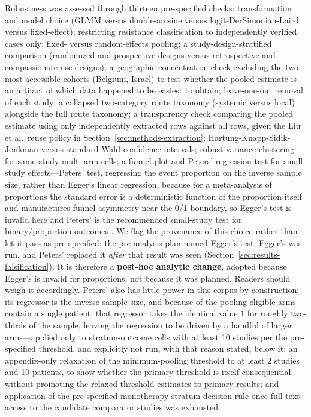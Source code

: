 Robustness was assessed through thirteen pre-specified checks: transformation and model choice (GLMM versus double-arcsine versus logit-DerSimonian-Laird versus fixed-effect); restricting resistance classification to independently verified cases only; fixed- versus random-effects pooling; a study-design-stratified comparison (randomized and prospective designs versus retrospective and compassionate-use designs); a geographic-concentration check excluding the two most accessible cohorts (Belgium, Israel) to test whether the pooled estimate is an artifact of which data happened to be easiest to obtain; leave-one-out removal of each study; a collapsed two-category route taxonomy (systemic versus local) alongside the full route taxonomy; a transparency check comparing the pooled estimate using only independently extracted rows against all rows, given the Liu et al.\ reuse policy in Section~\ref{sec:methods-extraction}; Hartung-Knapp-Sidik-Jonkman versus standard Wald confidence intervals; robust-variance clustering for same-study multi-arm cells; a funnel plot and Peters' regression test for small-study effects---Peters' test, regressing the event proportion on the inverse sample size, rather than Egger's linear regression, because for a meta-analysis of proportions the standard error is a deterministic function of the proportion itself and manufactures funnel asymmetry near the 0/1 boundary, so Egger's test is invalid here and Peters' is the recommended small-study test for binary/proportion outcomes \parencite{Peters2006_publicationbias}. We flag the provenance of this choice rather than let it pass as pre-specified: the pre-analysis plan named Egger's test, Egger's was run, and Peters' replaced it \emph{after} that result was seen (Section~\ref{sec:results-falsification}). It is therefore a \textbf{post-hoc analytic change}, adopted because Egger's is invalid for proportions, not because it was planned. Readers should weigh it accordingly. Peters' also has little power in this corpus by construction: its regressor is the inverse sample size, and because \SinglePatientArms of the \ArmsAnalysed pooling-eligible arms contain a single patient, that regressor takes the identical value $1$ for roughly two-thirds of the sample, leaving the regression to be driven by a handful of larger arms---applied only to stratum-outcome cells with at least 10 studies per the pre-specified threshold, and explicitly not run, with that reason stated, below it; an appendix-only relaxation of the minimum-pooling threshold to at least 2 studies and 10 patients, to show whether the primary threshold is itself consequential without promoting the relaxed-threshold estimates to primary results; and application of the pre-specified monotherapy-stratum decision rule once full-text access to the candidate comparator studies was exhausted.

